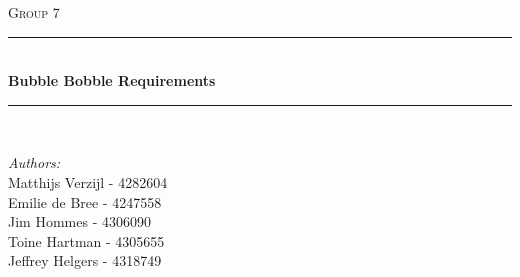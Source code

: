 \begin{titlepage}

\newcommand{\HRule}{\rule{\linewidth}{0.5mm}} %

\center %
 

\textsc{\LARGE Group 7}\\[1.5cm] %


\HRule \\[0.4cm]
{ \huge \bfseries Bubble Bobble Requirements}\\[0.4cm] %
\HRule \\[4cm]
 

\begin{minipage}{0.5\textwidth}
\begin{flushleft} \large
\emph{Authors:}\\     
Matthijs Verzijl - 4282604\\
Emilie de Bree - 4247558\\
Jim Hommes - 4306090\\
Toine Hartman - 4305655\\
Jeffrey Helgers - 4318749\\
\end{flushleft}
\end{minipage}
~
\begin{minipage}{0.4\textwidth}
\end{minipage}\\[7cm]




\end{titlepage}
